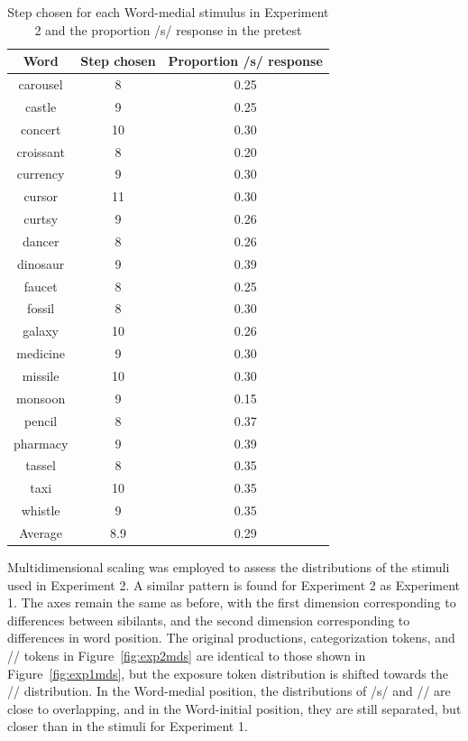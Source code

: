 \begin{table}
\caption{Step chosen for each Word-medial stimulus in Experiment 2 and the proportion /s/ response in the pretest}
\label{tbl:exp2srespfinal}
\centering
\begin{tabular}{ccc}
\toprule
 Word & Step chosen & Proportion /s/ response \\
\midrule
 carousel & 8 & 0.25 \\
 castle & 9 & 0.25 \\
 concert & 10 & 0.30 \\
 croissant & 8 & 0.20 \\
 currency & 9 & 0.30 \\
 cursor & 11 & 0.30 \\
 curtsy & 9 & 0.26 \\
 dancer & 8 & 0.26 \\
 dinosaur & 9 & 0.39 \\
 faucet & 8 & 0.25 \\
 fossil & 8 & 0.30 \\
 galaxy & 10 & 0.26 \\
 medicine & 9 & 0.30 \\
missile & 10 & 0.30 \\
monsoon & 9 & 0.15 \\
 pencil & 8 & 0.37 \\
 pharmacy & 9 & 0.39 \\
 tassel & 8 & 0.35 \\
 taxi & 10 & 0.35 \\
 whistle & 9 & 0.35 \\
\midrule
 Average  & 8.9 & 0.29 \\

\bottomrule
\end{tabular}
\end{table}

Multidimensional scaling was employed to assess the distributions of the stimuli used in Experiment 2.
A similar pattern is found for Experiment 2 as Experiment 1.
The axes remain the same as before, with the first dimension corresponding to differences between sibilants, and the second dimension corresponding to differences in word position.
The original productions, categorization tokens, and /\textesh/ tokens in Figure~\ref{fig:exp2mds} are identical to those shown in Figure~\ref{fig:exp1mds}, but the exposure token distribution is shifted towards the /\textesh/ distribution.  
In the Word-medial position, the distributions of /s/ and /\textesh/ are close to overlapping, and in the Word-initial position, they are still separated, but closer than in the stimuli for Experiment 1.


